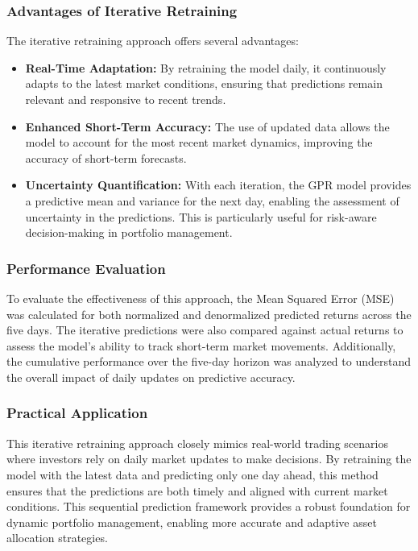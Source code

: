 \subsubsection{Advantages of Iterative Retraining}

The iterative retraining approach offers several advantages:

\begin{itemize}
    \item \textbf{Real-Time Adaptation:} By retraining the model daily, it continuously adapts to the latest market conditions, ensuring that predictions remain relevant and responsive to recent trends.
    \item \textbf{Enhanced Short-Term Accuracy:} The use of updated data allows the model to account for the most recent market dynamics, improving the accuracy of short-term forecasts.
    \item \textbf{Uncertainty Quantification:} With each iteration, the GPR model provides a predictive mean and variance for the next day, enabling the assessment of uncertainty in the predictions. This is particularly useful for risk-aware decision-making in portfolio management.
\end{itemize}

\subsubsection{Performance Evaluation}

To evaluate the effectiveness of this approach, the Mean Squared Error (MSE) was calculated for both normalized and denormalized predicted returns across the five days. The iterative predictions were also compared against actual returns to assess the model's ability to track short-term market movements. Additionally, the cumulative performance over the five-day horizon was analyzed to understand the overall impact of daily updates on predictive accuracy.

\subsubsection{Practical Application}

This iterative retraining approach closely mimics real-world trading scenarios where investors rely on daily market updates to make decisions. By retraining the model with the latest data and predicting only one day ahead, this method ensures that the predictions are both timely and aligned with current market conditions. This sequential prediction framework provides a robust foundation for dynamic portfolio management, enabling more accurate and adaptive asset allocation strategies.




